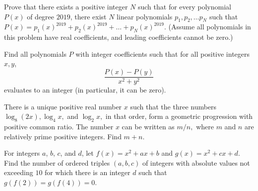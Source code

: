\documentclass[11pt]{article}
\theoremstyle{definition}
\begin{document}
\begin{question}[name={2018-2019 San Diego Power Contest, Winter, \href{https://artofproblemsolving.com/community/c6h2055914p14630375}{Problem 5}}]
	Prove that there exists a positive integer $N$ such that for every polynomial $P(x)$ of degree $2019$, there exist $N$ linear polynomials $p_1,p_2, \ldots p_N$ such that $P(x)=p_1(x)^{2019}+p_2(x)^{2019}+ \ldots + p_N(x)^{2019}$. (Assume all polynomials in this problem have real coefficients, and leading coefficients cannot be zero.)
\end{question}




%	



\begin{question}[name={2019-2020 San Diego Power Contest, Fall, \href{https://artofproblemsolving.com/community/c6h2036411p14381782}{Problem 3}}]
	Find all polynomials $P$ with integer coefficients such that for all positive integers $x,y$,$$\frac{P(x)-P(y)}{x^2+y^2}$$evaluates to an integer (in particular, it can be zero).
\end{question}




%	



\begin{question}[name={2020 AIME I, \href{https://artofproblemsolving.com/community/c4p14284233}{Problem 2}}]
	There is a unique positive real number $x$ such that the three numbers $\log_8(2x),\log_4x,$ and $\log_2x,$ in that order, form a geometric progression with positive common ratio. The number $x$ can be written as ${m}/{n},$ where $m$ and $n$ are relatively prime positive integers. Find $m+n$.	
\end{question}


%	












\begin{question}[name={2020 AIME I, \href{https://artofproblemsolving.com/community/c4p14285054}{Problem 11}}]
	For integers $a$, $b$, $c$, and $d$, let $f(x) = x^2 + ax + b$ and $g(x) = x^2 + cx + d$. Find the number of ordered triples $(a,b,c)$ of integers with absolute values not exceeding $10$ for which there is an integer $d$ such that $g(f(2)) = g(f(4)) = 0$.	
\end{question}
\end{document}
